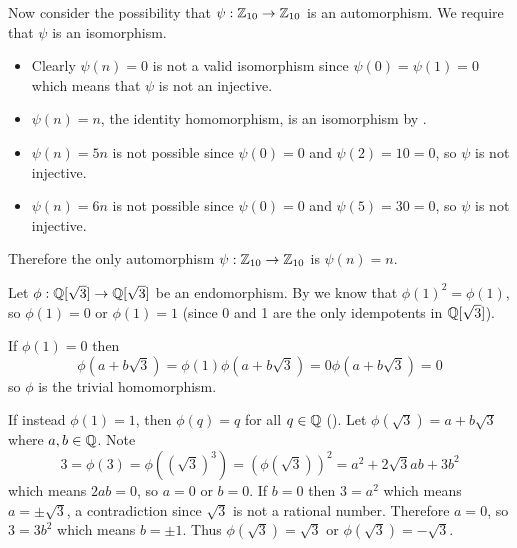\begin{questions}
    Now consider the possibility that $\psi: \mathbb{Z}_{10} \to \mathbb{Z}_{10}$ is an automorphism. We require that $\psi$ is an isomorphism.
    \begin{itemize}
        \item Clearly $\psi(n) = 0$ is not a valid isomorphism since $\psi(0) = \psi(1) = 0$ which means that $\psi$ is not an injective.
        \item $\psi(n) = n$, the identity homomorphism, is an isomorphism by .
        \item $\psi(n) = 5n$ is not possible since $\psi(0) = 0$ and $\psi(2) = 10 = 0$, so $\psi$ is not injective.
        \item $\psi(n) = 6n$ is not possible since $\psi(0) = 0$ and $\psi(5) = 30 = 0$, so $\psi$ is not injective.
    \end{itemize}
    Therefore the only automorphism $\psi:\mathbb{Z}_{10} \to \mathbb{Z}_{10}$ is $\psi(n) = n$.

    \item Let $\phi: \mathbb{Q}[\sqrt3] \to \mathbb{Q}[\sqrt3]$ be an endomorphism. By  we know that $\phi(1)^2 = \phi(1)$, so $\phi(1) = 0$ or $\phi(1) = 1$ (since 0 and 1 are the only idempotents in $\mathbb{Q}[\sqrt3]$).

    If $\phi(1) = 0$ then
    \[
        \phi(a+b\sqrt3) = \phi(1)\phi(a+b\sqrt3) = 0\phi(a+b\sqrt3) = 0
    \]
    so $\phi$ is the trivial homomorphism.

    If instead $\phi(1) = 1$, then $\phi(q) = q$ for all $q \in \mathbb{Q}$ (). Let $\phi(\sqrt3) = a+b\sqrt3$ where $a, b \in \mathbb{Q}$. Note
    \[
        3 = \phi(3) = \phi((\sqrt3)^3) = \left(\phi(\sqrt3)\right)^2 = a^2+2\sqrt3ab+3b^2
    \]
    which means $2ab = 0$, so $a = 0$ or $b = 0$. If $b = 0$ then $3 = a^2$ which means $a = \pm\sqrt3$, a contradiction since $\sqrt3$ is not a rational number. Therefore $a = 0$, so $3 = 3b^2$ which means $b = \pm1$. Thus $\phi(\sqrt3) = \sqrt3$ or $\phi(\sqrt3) = -\sqrt3$.


\end{questions}
